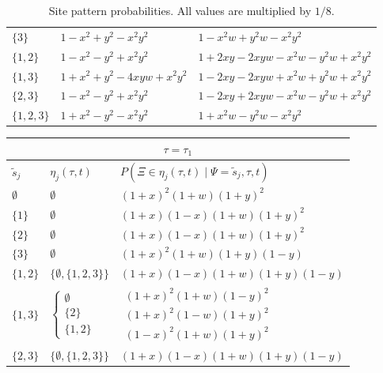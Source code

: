 \documentclass[a4paper]{article}
\newcommand{\siteSplit}{\tilde{s}}
\newcommand{\ancestralSplitPartition}{\eta}
\newcommand{\siteSplitRV}{\Psi}
\newcommand{\ancestralSplitRV}{\Xi}
\begin{document}
\begin{table}
\begin{tabular}{|l|l|l|}
    $\{3\}$        &$1-x^2+y^2-x^2y^2$&$1-x^2w+y^2w-x^2y^2$\\
    $\{1,2\}$      &$1-x^2-y^2+x^2y^2$&$1+2xy-2xyw-x^2w-y^2w+x^2y^2$\\
    $\{1,3\}$      &$1+x^2+y^2-4xyw+x^2y^2$&$1-2xy-2xyw+x^2w+y^2w+x^2y^2$\\
    $\{2,3\}$      &$1-x^2-y^2+x^2y^2$&$1-2xy+2xyw-x^2w-y^2w+x^2y^2$\\
    $\{1,2,3\}$    &$1+x^2-y^2-x^2y^2$&$1+x^2w-y^2w-x^2y^2$\\
    \hline
\end{tabular}
\caption{Site pattern probabilities.
All values are multiplied by $1/8$.}
\label{tab:sitepatprob}
\end{table}

\begin{table}
\centering
\begin{tabular}{|l|ll|}
    \multicolumn{3}{c}{$\tau=\tau_1$}\\
    \hline
    $\siteSplit_j$    & $\ancestralSplitPartition_j(\tau, t)$ & $P(\ancestralSplitRV\in\ancestralSplitPartition_j(\tau, t) \mid \siteSplitRV=\siteSplit_j,\tau,t)$\\
    \hline
    $\emptyset$&
    $\emptyset$&
    $(1+x)^2   (1+w)(1+y)^2$\\
     $\{1\}$    &
    $\emptyset$&
    $(1+x)(1-x)(1+w)(1+y)^2$\\
     $\{2\}$    &
    $\emptyset$&
    $(1+x)(1-x)(1+w)(1+y)^2$\\
     $\{3\}$    &
    $\emptyset$&
    $(1+x)^2   (1+w)(1+y)(1-y)$\\
    $\{1,2\}$  &
    $\{\emptyset,\{1,2,3\}\}$&
    $(1+x)(1-x)(1+w)(1+y)(1-y)$\\
    $\{1,3\}$  &
    $\left\{\begin{array}{l}
                    \emptyset\\
                    \{2\}\\
                    \{1,2\}
                \end{array}\right.$&
    $\begin{array}{l}
                    (1+x)^2   (1+w)(1-y)^2\\
                    (1+x)^2   (1-w)(1+y)^2\\
                    (1-x)^2   (1+w)(1+y)^2
                \end{array}$\\
    $\{2,3\}$  &
                $\{\emptyset,\{1,2,3\}\}$&
                $(1+x)(1-x)(1+w)(1+y)(1-y)$\\

\end{tabular}
\end{table}
\end{document}
